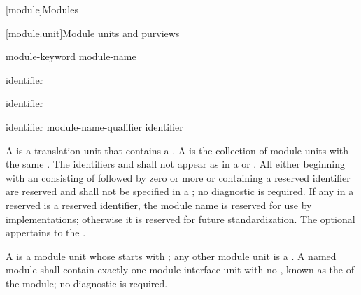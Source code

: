 [module]{Modules}%


[module.unit]{Module units and purviews}

\begin{bnf}
\br
     module-keyword module-name   \terminal{;}
\end{bnf}

\begin{bnf}
\br
     identifier
\end{bnf}

\begin{bnf}
\br
    \terminal{:}  identifier
\end{bnf}

\begin{bnf}
\br
    identifier \br
    module-name-qualifier identifier 
\end{bnf}

\pnum
A  is a translation unit that contains
a .
A  is the
collection of module units with the same .
The identifiers  and 
shall not appear as 
in a  or .
%
All  either beginning with an 
consisting of  followed by zero or more  or
containing a reserved identifier
are reserved and shall not be specified in a ;
no diagnostic is required.
If any  in a reserved 
is a reserved identifier,
the module name is reserved for use by \Cpp{} implementations;
otherwise it is reserved for future standardization.
The optional 
appertains to the .

\pnum
A  is a module unit whose
 starts with ;
any other module unit is a .
A named module shall contain exactly one module interface unit
with no , known as the
 of the module;
no diagnostic is required.

